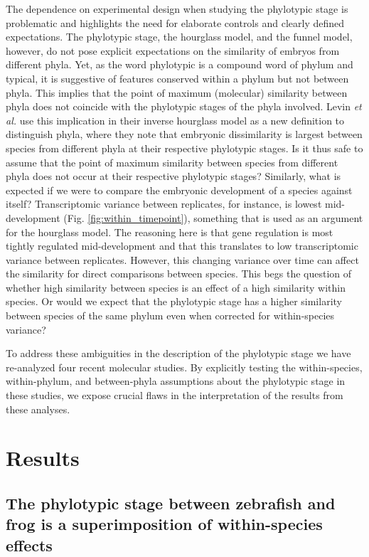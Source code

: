 The dependence on experimental design when studying the phylotypic stage is problematic and highlights the need for elaborate controls and clearly defined expectations. The phylotypic stage, the hourglass model, and the funnel model, however, do not pose explicit expectations on the similarity of embryos from different phyla. Yet, as the word phylotypic is a compound word of phylum and typical, it is suggestive of features conserved within a phylum but not between phyla. This implies that the point of maximum (molecular) similarity between phyla does not coincide with the phylotypic stages of the phyla involved. Levin \textit{et al.}\cite{Levin2016} use this implication in their inverse hourglass model as a new definition to distinguish phyla, where they note that embryonic dissimilarity is largest between species from different phyla at their respective phylotypic stages. Is it thus safe to assume that the point of maximum similarity between species from different phyla does not occur at their respective phylotypic stages? Similarly, what is expected if we were to compare the embryonic development of a species against itself? Transcriptomic variance between replicates, for instance, is lowest mid-development (Fig. \ref{fig:within_timepoint}), something that is used as an argument for the hourglass model\cite{Liu2020, Uchida2022}. The reasoning here is that gene regulation is most tightly regulated mid-development and that this translates to low transcriptomic variance between replicates. However, this changing variance over time can affect the similarity for direct comparisons between species. This begs the question of whether high similarity between species is an effect of a high similarity within species. Or would we expect that the phylotypic stage has a higher similarity between species of the same phylum even when corrected for within-species variance?

To address these ambiguities in the description of the phylotypic stage we have re-analyzed four recent molecular studies. By explicitly testing the within-species, within-phylum, and between-phyla assumptions about the phylotypic stage in these studies, we expose crucial flaws in the interpretation of the results from these analyses.

\section{Results}

\subsection{The phylotypic stage between zebrafish and frog is a superimposition of within-species effects} \label{subsection:marletaz}

